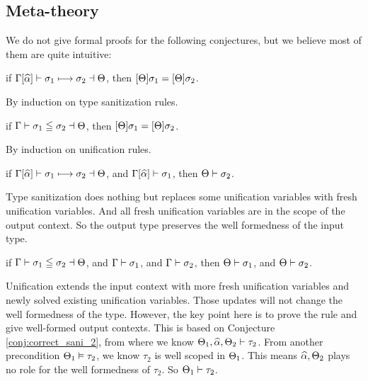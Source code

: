\subsection{Meta-theory}

We do not give formal proofs for the following conjectures, but we believe most of
them are quite intuitive:

\begin{conjecture}
  if $\Gamma[\widehat{\alpha}] \vdash \sigma_1 \longmapsto \sigma_2 \dashv \Theta$,
  then $[\Theta] \sigma_1 = [\Theta] \sigma_2$.
\end{conjecture}
\begin{hproof}
  By induction on type sanitization rules.
\end{hproof}

\begin{conjecture}
  if $\Gamma \vdash \sigma_1 \leqq \sigma_2 \dashv \Theta$,
  then $[\Theta] \sigma_1 = [\Theta] \sigma_2$.
\end{conjecture}
\begin{hproof}
  By induction on unification rules.
\end{hproof}

\begin{conjecture}
  \label{conj:correct_sani_2}
  if $\Gamma[\widehat{\alpha}] \vdash \sigma_1 \longmapsto \sigma_2 \dashv \Theta$,
  and $\Gamma[\widehat{\alpha}] \vdash \sigma_1$,
  then $\Theta \vdash \sigma_2$.
\end{conjecture}
\begin{hproof}
  Type sanitization does nothing but replaces some unification variables with
  fresh unification variables. And all fresh unification variables are in the
  scope of the output context. So the output type preserves the well formedness
  of the input type.
\end{hproof}

\begin{conjecture}
  if $\Gamma \vdash \sigma_1 \leqq \sigma_2 \dashv \Theta$,
  and $\Gamma \vdash \sigma_1$,
  and $\Gamma \vdash \sigma_2$,
  then $\Theta \vdash \sigma_1$,
  and $\Theta \vdash \sigma_2$.
\end{conjecture}
\begin{hproof}
  Unification extends the input context with more fresh unification variables
  and newly solved existing unification variables. Those updates will not change
  the well formedness of the type. However, the key point here is to prove the rule
   and  give well-formed output contexts. This is
  based on Conjecture \ref{conj:correct_sani_2}, from where we know $\Theta_1,
  \widehat{\alpha}, \Theta_2 \vdash \tau_2$. From another precondition $\Theta_1 \vDash
  \tau_2$, we know $\tau_2$ is well scoped in $\Theta_1$. This means $\widehat{\alpha}, \Theta_2$
  plays no role for the well formedness of $\tau_2$. So $\Theta_1 \vdash \tau_2$.
\end{hproof}